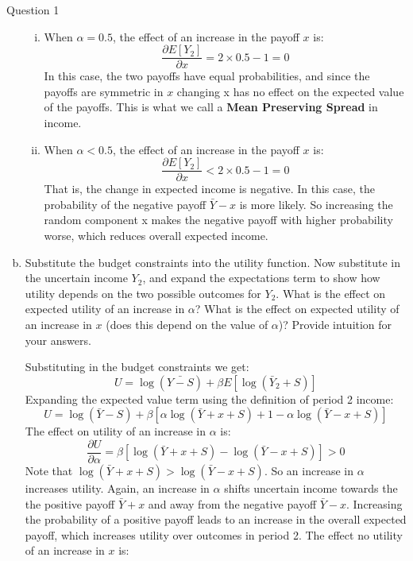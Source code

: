 \documentclass[a4paper]{article}
\begin{document}
\begin{questionbox}{Question 1}
\begin{enumerate}[(a)]
\begin{explanationbox}
\begin{enumerate}[(i)]
					\item When \( \alpha = 0.5 \), the effect of an increase in the payoff \( x \) is:
					\[
						\frac{\partial E[Y_2]}{\partial x} = 2 \times 0.5 - 1 = 0
					\]
					In this case, the two payoﬀs have equal probabilities, and since the payoﬀs are symmetric in \( x \) changing x has no eﬀect on the expected value of the payoﬀs. This is what we call a \textbf{\textcolor{mygreen}{Mean Preserving Spread}} in income.
					\item When \( \alpha < 0.5 \), the effect of an increase in the payoff \( x \) is:
					\[
						\frac{\partial E[Y_2]}{\partial x} < 2 \times 0.5 - 1 = 0
					\]
					That is, the change in expected income is negative. In this case, the probability of the negative payoﬀ \( \bar{Y} - x \) is more likely. So increasing the random component x makes the negative payoff with higher probability worse, which reduces overall expected income.
				\end{enumerate}
			\end{explanationbox}\pagebreak
			\item Substitute the budget constraints into the utility function. Now substitute in the uncertain income \( Y_2 \), and expand the expectations term to show how utility depends on the two possible outcomes for \( Y_2 \). What is the eﬀect on expected utility of an increase in \( \alpha \)? What is the eﬀect on expected utility of an increase in \( x \) (does this depend on the value of \( \alpha \))? Provide intuition for your answers.
			\begin{explanationbox}
				Substituting in the budget constraints we get:
				\[
					U = \log (\bar{Y - S}) + \beta E\left[ \log(\bar{Y}_2 + S) \right]
				\]
				Expanding the expected value term using the deﬁnition of period 2 income:
				\[
					U = \log (\bar{Y}- S) + \beta[\alpha\log(\bar{Y} + x + S) + 1-\alpha \log(\bar{Y} - x + S)]
				\]
				The effect on utility of an increase in \( \alpha \) is:
				\[
					\frac{\partial U}{\partial \alpha} = \beta\left[ \log(\bar{Y} + x + S) - \log(\bar{Y} - x + S) \right] > 0
				\]
				Note that \( \log(\bar{Y} + x + S) > \log(\bar{Y} - x + S) \). So an increase in \( \alpha \) increases utility. Again, an increase in \( \alpha \) shifts uncertain income towards the the positive payoff \( \bar{Y} + x \) and away from the negative payoff \( \bar{Y} - x \). Increasing the probability of a positive payoﬀ leads to an increase in the overall expected payoﬀ, which increases utility over outcomes in period 2. The eﬀect no utility of an increase in \( x \) is:

\end{explanationbox}
\end{enumerate}
\end{questionbox}
\end{document}
